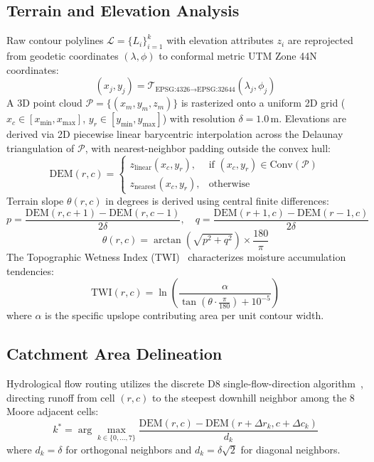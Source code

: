 \documentclass[manuscript,screen,review]{acmart}
\begin{document}
\subsection{Terrain and Elevation Analysis}
Raw contour polylines $\mathcal{L} = \{L_i\}_{i=1}^k$ with elevation attributes $z_i$ are reprojected from geodetic coordinates $(\lambda, \phi)$ to conformal metric UTM Zone 44N coordinates:
\begin{equation}
    (x_j, y_j) = \mathcal{T}_{\text{EPSG:4326} \to \text{EPSG:32644}}(\lambda_j, \phi_j)
\end{equation}
A 3D point cloud $\mathcal{P} = \{(x_m, y_m, z_m)\}$ is rasterized onto a uniform 2D grid ($x_c \in [x_{\min}, x_{\max}]$, $y_r \in [y_{\min}, y_{\max}]$) with resolution $\delta = 1.0\,\text{m}$. Elevations are derived via 2D piecewise linear barycentric interpolation across the Delaunay triangulation of $\mathcal{P}$, with nearest-neighbor padding outside the convex hull:
\begin{equation}
    \text{DEM}(r, c) = \begin{cases}
        z_{\text{linear}}(x_c, y_r), & \text{if } (x_c, y_r) \in \text{Conv}(\mathcal{P}) \\
        z_{\text{nearest}}(x_c, y_r), & \text{otherwise}
    \end{cases}
\end{equation}
Terrain slope $\theta(r, c)$ in degrees is derived using central finite differences:
\begin{equation}
    p = \frac{\text{DEM}(r, c+1) - \text{DEM}(r, c-1)}{2\delta}, \quad
    q = \frac{\text{DEM}(r+1, c) - \text{DEM}(r-1, c)}{2\delta}
\end{equation}
\begin{equation}
    \theta(r, c) = \arctan\left(\sqrt{p^2 + q^2}\right) \times \frac{180}{\pi}
\end{equation}
The Topographic Wetness Index (TWI)~\cite{beven1979physically} characterizes moisture accumulation tendencies:
\begin{equation}
    \text{TWI}(r, c) = \ln\left( \frac{\alpha}{\tan(\theta \cdot \frac{\pi}{180}) + 10^{-5}} \right)
\end{equation}
where $\alpha$ is the specific upslope contributing area per unit contour width.

\subsection{Catchment Area Delineation}
Hydrological flow routing utilizes the discrete D8 single-flow-direction algorithm~\cite{tarboton1991new}, directing runoff from cell $(r, c)$ to the steepest downhill neighbor among the 8 Moore adjacent cells:
\begin{equation}
    k^* = \arg\max_{k \in \{0, \dots, 7\}} \frac{\text{DEM}(r, c) - \text{DEM}(r + \Delta r_k, c + \Delta c_k)}{d_k}
\end{equation}
where $d_k = \delta$ for orthogonal neighbors and $d_k = \delta \sqrt{2}$ for diagonal neighbors.
\end{document}
